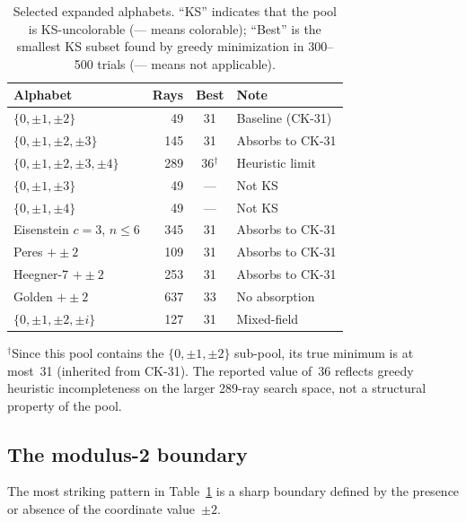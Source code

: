 \documentclass[twocolumn,pra,superscriptaddress,nofootinbib]{revtex4-2}
\begin{document}
\begin{table}[t]
\centering
\caption{Selected expanded alphabets. ``KS'' indicates that the pool is
KS-uncolorable (--- means colorable); ``Best'' is the smallest KS subset
found by greedy minimization in 300--500 trials (--- means not applicable).}
\label{tab:alphabets}
\begin{tabular}{lrcl}
\toprule
Alphabet & Rays & Best & Note \\
\midrule
$\{0,\pm1,\pm2\}$ & 49 & 31 & Baseline (CK-31) \\
$\{0,\pm1,\pm2,\pm3\}$ & 145 & 31 & Absorbs to CK-31 \\
$\{0,\pm1,\pm2,\pm3,\pm4\}$ & 289 & 36$^\dagger$ & Heuristic limit \\
$\{0,\pm1,\pm3\}$ & 49 & --- & Not KS \\
$\{0,\pm1,\pm4\}$ & 49 & --- & Not KS \\
Eisenstein $c{=}3$, $n{\leq}6$ & 345 & 31 & Absorbs to CK-31 \\
Peres $+ \pm2$ & 109 & 31 & Absorbs to CK-31 \\
Heegner-7 $+ \pm2$ & 253 & 31 & Absorbs to CK-31 \\
Golden $+ \pm2$ & 637 & 33 & No absorption \\
$\{0,\pm1,\pm2,\pm i\}$ & 127 & 31 & Mixed-field \\
\bottomrule
\end{tabular}
\end{table}

$^\dagger$Since this pool contains the $\{0,\pm1,\pm2\}$ sub-pool, its true
minimum is at most~31 (inherited from CK-31). The reported value of~36
reflects greedy heuristic incompleteness on the larger 289-ray search space,
not a structural property of the pool.

\subsection{The modulus-2 boundary}

The most striking pattern in Table~\ref{tab:alphabets} is a sharp boundary
defined by the presence or absence of the coordinate value~$\pm2$.
\end{document}
